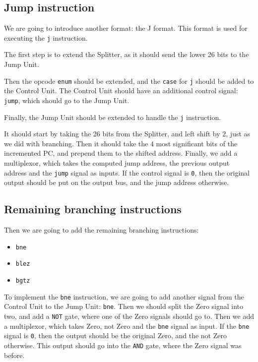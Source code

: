 \documentclass{beamer}
\begin{document}
\subsection{Jump instruction}
\begin{frame}
    We are going to introduce another format: the J format. This format is used
    for executing the \texttt{j} instruction.

    \vspace{\baselineskip}
    The first step is to extend the Splitter, as it should send the lower 26
    bits to the Jump Unit.

    \vspace{\baselineskip}
    Then the opcode \texttt{enum} should be extended, and the \texttt{case} for
    \texttt{j} should be added to the Control Unit. The Control Unit should
    have an additional control signal: \texttt{jump}, which should go to the
    Jump Unit.
\end{frame}
\begin{frame}
    Finally, the Jump Unit should be extended to handle the \texttt{j}
    instruction.

    \vspace{\baselineskip}
    It should start by taking the 26 bits from the Splitter, and left shift by
    2, just as we did with branching. Then it should take the 4 most
    significant bits of the incremented PC, and prepend them to the shifted
    address. Finally, we add a multiplexor, which takes the computed jump
    address, the previous output address and the \texttt{jump} signal as
    inputs. If the control signal is \texttt{0}, then the original output
    should be put on the output bus, and the jump address otherwise.
\end{frame}

\subsection{Remaining branching instructions}
\begin{frame}
    Then we are going to add the remaining branching instructions:
    \begin{itemize}
        \item \texttt{bne}
        \item \texttt{blez}
        \item \texttt{bgtz}
    \end{itemize}
\end{frame}
\begin{frame}
    To implement the \texttt{bne} instruction, we are going to add another
    signal from the Control Unit to the Jump Unit: \texttt{bne}. Then we should
    split the Zero signal into two, and add a \texttt{NOT} gate, where one of
    the Zero signals should go to. Then we add a multiplexor, which takes Zero,
    not Zero and the \texttt{bne} signal as input. If the \texttt{bne} signal
    is \texttt{0}, then the output should be the original Zero, and the not
    Zero otherwise. This output should go into the \texttt{AND} gate, where the
    Zero signal was before.
\end{frame}
\end{document}
